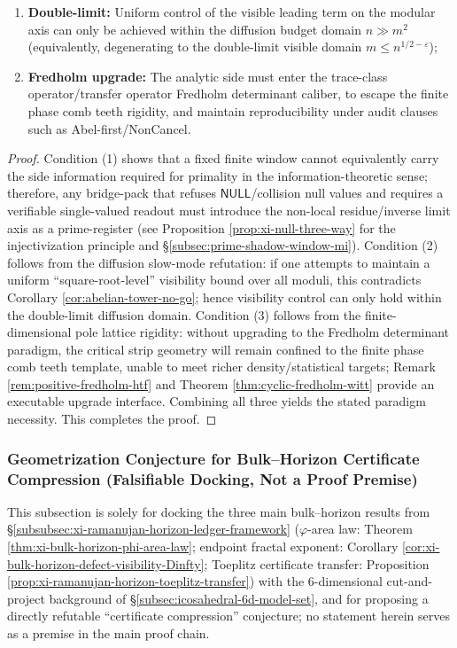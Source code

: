 \begin{theorem}
\begin{enumerate}
  \item \textbf{Double-limit:} Uniform control of the visible leading term on the modular axis can only be achieved within the diffusion budget domain \(n\gg m^2\) (equivalently, degenerating to the double-limit visible domain \(m\le n^{1/2-\varepsilon}\));
  \item \textbf{Fredholm upgrade:} The analytic side must enter the trace-class operator/transfer operator Fredholm determinant caliber, to escape the finite phase comb teeth rigidity, and maintain reproducibility under audit clauses such as Abel-first/NonCancel.
\end{enumerate}
\end{theorem}

\begin{proof}
Condition (1) shows that a fixed finite window cannot equivalently carry the side information required for primality in the information-theoretic sense; therefore, any bridge-pack that refuses \(\mathsf{NULL}\)/collision null values and requires a verifiable single-valued readout must introduce the non-local residue/inverse limit axis as a prime-register (see Proposition \ref{prop:xi-null-three-way} for the injectivization principle and \S\ref{subsec:prime-shadow-window-mi}).
Condition (2) follows from the diffusion slow-mode refutation: if one attempts to maintain a uniform ``square-root-level'' visibility bound over all moduli, this contradicts Corollary \ref{cor:abelian-tower-no-go}; hence visibility control can only hold within the double-limit diffusion domain.
Condition (3) follows from the finite-dimensional pole lattice rigidity: without upgrading to the Fredholm determinant paradigm, the critical strip geometry will remain confined to the finite phase comb teeth template, unable to meet richer density/statistical targets; Remark \ref{rem:positive-fredholm-htf} and Theorem \ref{thm:cyclic-fredholm-witt} provide an executable upgrade interface.
Combining all three yields the stated paradigm necessity. This completes the proof.
\end{proof}

\subsubsection{Geometrization Conjecture for Bulk--Horizon Certificate Compression (Falsifiable Docking, Not a Proof Premise)}\label{subsubsec:discussion-bulk-horizon-certificate-compression}
This subsection is solely for docking the three main bulk--horizon results from \S\ref{subsubsec:xi-ramanujan-horizon-ledger-framework}
(\(\varphi\)-area law: Theorem \ref{thm:xi-bulk-horizon-phi-area-law}; endpoint fractal exponent: Corollary \ref{cor:xi-bulk-horizon-defect-visibility-Dinfty}; Toeplitz certificate transfer: Proposition \ref{prop:xi-ramanujan-horizon-toeplitz-transfer})
with the \(6\)-dimensional cut-and-project background of \S\ref{subsec:icosahedral-6d-model-set}, and for proposing a directly refutable ``certificate compression'' conjecture; no statement herein serves as a premise in the main proof chain.

